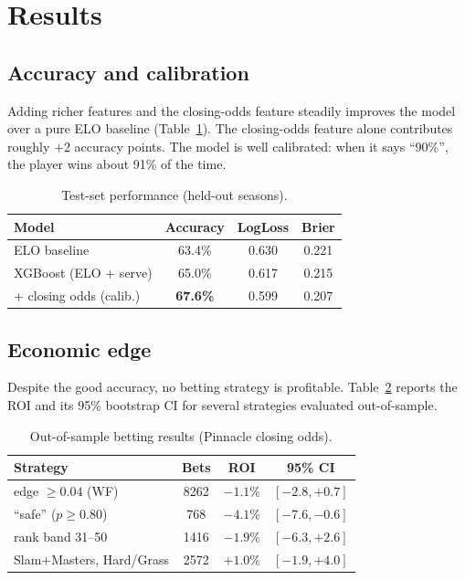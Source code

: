 \documentclass[10pt,twocolumn]{article}
\begin{document}
\section{Results}

\subsection{Accuracy and calibration}
Adding richer features and the closing-odds feature steadily improves the model
over a pure ELO baseline (Table~\ref{tab:acc}). The closing-odds feature alone
contributes roughly $+2$ accuracy points. The model is well calibrated: when it
says ``90\%'', the player wins about 91\% of the time.

\begin{table}[t]
\centering
\caption{Test-set performance (held-out seasons).}
\label{tab:acc}
\begin{tabular}{lccc}
\toprule
Model & Accuracy & LogLoss & Brier \\
\midrule
ELO baseline              & 63.4\% & 0.630 & 0.221 \\
XGBoost (ELO + serve)     & 65.0\% & 0.617 & 0.215 \\
\;+ closing odds (calib.) & \textbf{67.6\%} & 0.599 & 0.207 \\
\bottomrule
\end{tabular}
\end{table}

\subsection{Economic edge}
Despite the good accuracy, no betting strategy is profitable. Table~\ref{tab:roi}
reports the ROI and its 95\% bootstrap CI for several strategies evaluated
out-of-sample.

\begin{table}[t]
\centering
\caption{Out-of-sample betting results (Pinnacle closing odds).}
\label{tab:roi}
\begin{tabular}{lccc}
\toprule
Strategy & Bets & ROI & 95\% CI \\
\midrule
edge $\ge 0.04$ (WF)        & 8262 & $-1.1\%$ & $[-2.8,+0.7]$ \\
``safe'' ($p\ge0.80$)       & 768  & $-4.1\%$ & $[-7.6,-0.6]$ \\
rank band 31--50            & 1416 & $-1.9\%$ & $[-6.3,+2.6]$ \\
Slam+Masters, Hard/Grass    & 2572 & $+1.0\%$ & $[-1.9,+4.0]$ \\
\bottomrule
\end{tabular}
\end{table}
\end{document}
